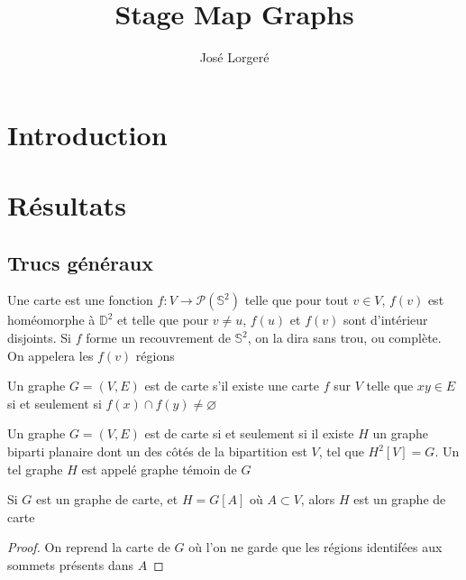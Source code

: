 \documentclass{scrartcl}
\begin{document}
\title{Stage Map Graphs}

\author{José Lorgeré}

\maketitle

\begin{flushleft}

\section*{Introduction}

\section{Résultats}

\subsection{Trucs généraux}

\begin{def*}[Carte]
    Une carte est une fonction $f : V \rightarrow \mathcal{P}(\mathbb{S}^2)$ telle que pour tout $v \in V$, $f(v)$
    est homéomorphe à $\mathbb{D}^2$ et telle que pour $v \neq u$, $f(u)$ et $f(v)$ sont d'intérieur disjoints. Si
    $f$ forme un recouvrement de $\mathbb{S}^2$, on la dira sans trou, ou complète. On appelera les $f(v)$ régions
\end{def*}

\begin{def*}
    Un graphe $G = (V, E)$ est de carte s'il existe une carte $f$ sur $V$ telle que $xy \in E$ si et seulement si
    $f(x) \cap f(y) \neq \varnothing$
\end{def*}

\begin{theorem}\label{carCarte}
    Un graphe $G = (V, E)$ est de carte si et seulement si il existe $H$ un graphe biparti planaire dont un des
    côtés de la bipartition est $V$, tel que $H^2[V] = G$. Un tel graphe $H$ est appelé graphe témoin de $G$
\end{theorem}

\begin{prop}
    Si $G$ est un graphe de carte, et $H = G[A]$ où $A \subset V$, alors $H$ est un graphe de carte
\end{prop}

\begin{proof}
    On reprend la carte de $G$ où l'on ne garde que les régions identifées aux sommets présents dans $A$
\end{proof}


\end{flushleft}
\end{document}
